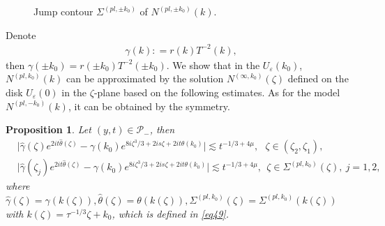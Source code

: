 \documentclass[11pt]{article}
\numberwithin{equation}{section}
\newtheorem{Proposition}{Proposition}
\begin{document}
\begin{figure}
    \caption{Jump contour $\Sigma^{(pl,\pm k_0)}$ of $N^{(pl, \pm k_0)}(k)$.}
     \label{jump-pl}
\end{figure}
\FloatBarrier

Denote
\begin{align*}
\gamma(k): =r(k)T^{-2}(k),
\end{align*}
then $\gamma(\pm k_0) =r(\pm k_0)T^{-2}(\pm k_0)$.
We show that  in the $U_{\varepsilon}(k_0)$,   $N^{(pl,  k_0)}(k)$ can be approximated by the solution $N^{(\infty,k_0)}(\zeta)$ defined on the disk $U_{\varepsilon}(0)$ in the $\zeta$-plane based on  the following estimates. As for the model $N^{(pl,  -k_0)}(k)$, it can be obtained by the symmetry.

\begin{Proposition}\label{p24}
    Let  $(y,t)\in \mathcal{P}_{-}$,  then
\begin{align}
 & \Big| \widehat\gamma\left(\zeta\right)   e^{2it\widehat\theta \left(\zeta\right)}- \gamma(k_0)   e^{8i\zeta^3/3+2is\zeta+2it\theta(k_0) }  \Big|   \lesssim t^{-1/3+4\mu}, \ \ \ \zeta   \in \left(\zeta_2,  \zeta_1\right), \label{eq55}\\
 &  \Big| \widehat\gamma \left(\zeta_j \right)   e^{2it\widehat\theta \left(\zeta\right)}- \gamma(k_0) e^{8i\zeta^3/3+2is\zeta+2it\theta(k_0) }  \Big|   \lesssim t^{-1/3+4\mu},    \ \  \zeta \in  \Sigma^{(pl,k_0)}(\zeta), \ j=1,2,\label{eq56}
\end{align}
where $\widehat\gamma(\zeta)=\gamma(k(\zeta)),\widehat\theta(\zeta)=\theta(k(\zeta)),\Sigma^{(pl,k_0)}(\zeta)=\Sigma^{(pl,k_0)}(k(\zeta))$ with $k(\zeta)=\tau^{-1/3}\zeta+k_0$, which is defined in \eqref{eq49}.
\end{Proposition}
\end{document}
